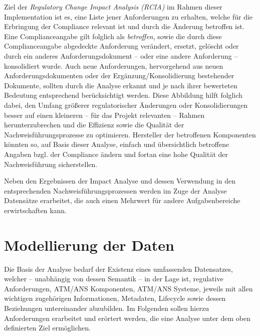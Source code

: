 Ziel der \textit{Regulatory Change Impact Analysis (RCIA)} im Rahmen dieser Implementation ist es, eine Liste jener Anforderungen zu erhalten, welche für die Erbringung der Compliance relevant ist und durch die Änderung betroffen ist. 
Eine Complianceangabe gilt folglich als \textit{betroffen}, sowie die durch diese Complianceangabe abgedeckte Anforderung verändert, ersetzt, gelöscht oder durch ein anderes Anforderungsdokument -- oder eine andere Anforderung -- konsolidiert wurde.
Auch neue Anforderungen, hervorgehend aus neuen Anforderungsdokumenten oder der Ergänzung/Konsolidierung bestehender Dokumente, sollten durch die Analyse erkannt und je nach ihrer bewerteten Bedeutung entsprechend berücksichtigt werden.   
Diese Abbildung hilft folglich dabei, den Umfang größerer regulatorischer Änderungen oder Konsolidierungen besser auf einen kleineren -- für das Projekt relevanten -- Rahmen herunterzubrechen und die Effizienz sowie die Qualität der Nachweisführungsprozesse zu optimieren. 
Hersteller der betroffenen Komponenten könnten so, auf Basis dieser Analyse, einfach und übersichtlich betroffene Angaben bzgl. der Compliance ändern und fortan eine hohe Qualität der Nachweisführung sicherstellen.

Neben den Ergebnissen der Impact Analyse und dessen Verwendung in den entsprechenden Nachweisführungsprozessen werden im Zuge der Analyse Datensätze erarbeitet, die auch einen Mehrwert für andere Aufgabenbereiche erwirtschaften kann. 




\pagebreak

    
\section{Modellierung der Daten} 

Die Basis der Analyse bedarf der Existenz eines umfassenden Datensatzes, welcher -- unabhängig von dessen Semantik -- in der Lage ist, regulative Anforderungen, ATM/ANS Komponenten, ATM/ANS Systeme, jeweils mit allen wichtigen zugehörigen Informationen, Metadaten, Lifecycle sowie dessen Beziehungen untereinander abzubilden.
Im Folgenden sollen hierzu Anforderungen erarbeitet und erörtert werden, die eine Analyse unter dem oben definierten Ziel ermöglichen.


